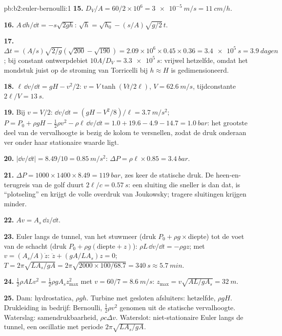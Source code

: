 \begin{solution}{pb:b2:euler-bernoulli:1}
\textbf{15.} $D_V/A = 60/2 \times 10^6 = \qty{3e-5}{m/s} = \qty{11}{cm/h}$.

\textbf{16.} $A\,\dd h/\dd t = -s\sqrt{2gh}$:
$\sqrt h = \sqrt{h_0} - (s/A)\sqrt{g/2}\,t$.

\textbf{17.}
$\Delta t = (A/s)\sqrt{2/g}(\sqrt{200} - \sqrt{190}) = 2.09 \times 10^6 \times
0.45 \times 0.36 = \qty{3.4e5}{s} = \qty{3.9}{dagen}$;
bij constant ontwerpdebiet $10A/D_V = \qty{3.3e5}{s}$: vrijwel hetzelfde,
omdat het mondstuk juist op de stroming van Torricelli bij $h \approx H$ is
gedimensioneerd.

\textbf{18.} $\ell\,\dd v/\dd t = gH - v^2/2$: $v = V\tanh(Vt/2\ell)$,
$V = \qty{62.6}{m/s}$, tijdconstante $2\ell/V = \qty{13}{s}$.

\textbf{19.} Bij $v = V/2$:
$\dd v/\dd t = (gH - V^2/8)/\ell = \qty{3.7}{m/s^2}$;
$P = P_0 + \rho gH - \tfrac12\rho v^2 - \rho\ell\,\dd v/\dd t = 1.0 + 19.6 - 4.9 - 14.7
= \qty{1.0}{bar}$:
het grootste deel van de vervalhoogte is bezig de kolom te versnellen, zodat
de druk onderaan ver onder haar stationaire waarde ligt.

\textbf{20.} $|\dd v/\dd t| = 8.49/10 = \qty{0.85}{m/s^2}$:
$\Delta P = \rho\ell \times 0.85 =
\qty{3.4}{bar}$.

\textbf{21.} $\Delta P = 1000 \times 1400 \times 8.49 = \qty{119}{bar}$, zes
keer de statische druk. De heen-en-terugreis van de golf duurt
$2\ell/c = \qty{0.57}{s}$: een sluiting die sneller is dan dat, is
``plotseling'' en krijgt de volle overdruk van Joukowsky; tragere sluitingen
krijgen minder.

\textbf{22.} $Av = A_s\,\dd z/\dd t$.

\textbf{23.} Euler langs de tunnel, van het stuwmeer (druk
$P_0 + \rho g\times$diepte) tot de voet van de schacht (druk
$P_0 + \rho g
(\text{diepte} + z)$): $\rho L\,\dd v/\dd t = -\rho gz$; met
$v = (A_s/A)\dot z$: $\ddot z + (gA/LA_s)z = 0$;
$T = 2\pi\sqrt{LA_s/gA} = 2\pi\sqrt{2000 \times 100/
68.7} = \qty{340}{s} \approx \qty{5.7}{min}$.

\textbf{24.} $\tfrac12\rho ALv^2 = \tfrac12\rho gA_sz_{\max}^2$ met
$v = 60/7 =
\qty{8.6}{m/s}$: $z_{\max} = v\sqrt{AL/gA_s} = \qty{32}{m}$.

\textbf{25.} Dam: hydrostatica, $\rho gh$. Turbine met gesloten afsluiters:
hetzelfde, $\rho gH$. Drukleiding in bedrijf: Bernoulli, $\tfrac12\rho v^2$
genomen uit de statische vervalhoogte. Waterslag: samendrukbaarheid,
$\rho c\Delta v$. Waterslot: niet-stationaire Euler langs de tunnel, een
oscillatie met periode $2\pi\sqrt{LA_s/gA}$.
\end{solution}
